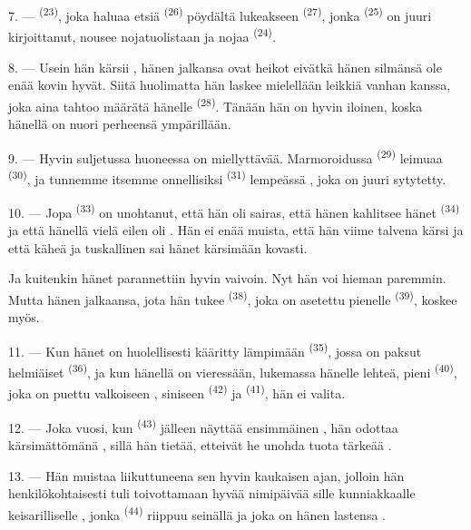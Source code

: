 7. ---  \textsuperscript{(23)}, joka haluaa etsiä
 \textsuperscript{(26)} pöydältä lukeakseen
 \textsuperscript{(27)}, jonka 
\textsuperscript{(25)} on juuri kirjoittanut, nousee nojatuolistaan ja nojaa
 \textsuperscript{(24)}.

8. --- Usein hän kärsii , hänen jalkansa ovat heikot eivätkä hänen
silmänsä ole enää kovin hyvät. Siitä huolimatta hän laskee mielellään leikkiä
vanhan  kanssa, joka aina tahtoo määrätä hänelle
 \textsuperscript{(28)}. Tänään hän on hyvin iloinen,
koska hänellä on nuori perheensä ympärillään.

9. --- Hyvin suljetussa huoneessa on miellyttävää. Marmoroidussa
 \textsuperscript{(29)} leimuaa 
\textsuperscript{(30)}, ja tunnemme itsemme onnellisiksi 
\textsuperscript{(31)} lempeässä , joka on juuri sytytetty.

\VUsaut{4.2mm}
\VUsaut{3.0mm}

10. --- Jopa  \textsuperscript{(33)} on unohtanut, että hän oli
sairas, että hänen  kahlitsee hänet
 \textsuperscript{(34)} ja että hänellä vielä eilen oli
. Hän ei enää muista, että hän viime talvena
kärsi  ja että käheä ja tuskallinen  sai
hänet kärsimään kovasti.

Ja kuitenkin hänet parannettiin hyvin vaivoin. Nyt hän voi hieman paremmin.
Mutta hänen jalkaansa, jota hän tukee  \textsuperscript{(38)},
joka on asetettu pienelle  \textsuperscript{(39)}, koskee
myös.

11. --- Kun hänet on huolellisesti kääritty lämpimään
 \textsuperscript{(35)}, jossa on paksut helmiäiset
 \textsuperscript{(36)}, ja kun hänellä on vieressään, lukemassa
hänelle lehteä, pieni  \textsuperscript{(40)}, joka on puettu
valkoiseen , siniseen  \textsuperscript{(42)} ja
 \textsuperscript{(41)}, hän ei valita.

12. --- Joka vuosi, kun  \textsuperscript{(43)} jälleen
näyttää  ensimmäinen , hän
odottaa kärsimättömänä , sillä hän tietää, etteivät he
unohda tuota tärkeää .

13. --- Hän muistaa liikuttuneena sen hyvin kaukaisen ajan, jolloin hän
henkilökohtaisesti tuli toivottamaan hyvää nimipäivää sille kunniakkaalle
keisarilliselle , jonka 
\textsuperscript{(44)} riippuu seinällä ja joka on hänen lastensa
.
\VUsaut{6.0mm}
\VUfilet{22mm}
